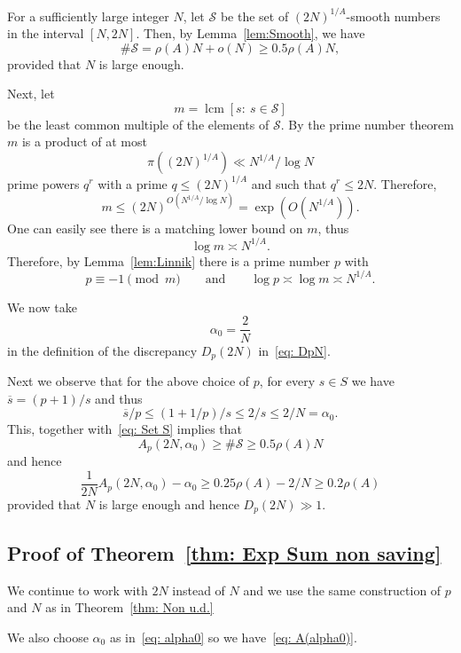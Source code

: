 \documentclass[12pt]{amsart}
\numberwithin{equation}{section}
\numberwithin{theorem}{section}
\numberwithin{table}{section}
\numberwithin{figure}{section}
\def\cS{{\mathcal S}}
\def\le{\leqslant}
\def\ge{\geqslant}
\def\sbar{\overline{s}}
\def\mand{\qquad\mbox{and}\qquad}
\def\({\left(}
\def\){\right)}
\newcommand{\lcm}{\operatorname{lcm}}
\begin{document}
For a sufficiently large integer $N$, let $\cS$ be the set  of $(2N)^{1/A}$-smooth numbers in the interval $[N, 2N]$. 
Then, by Lemma~\ref{lem:Smooth}, we have 
\begin{equation}
\label{eq: Set S}
\# \cS =  \rho(A) N + o(N)  \ge 0.5  \rho(A) N , 
\end{equation}
provided that $N$ is large enough. 

Next, let 
$$
m = \lcm[s:~s \in \cS]
$$
be the least common multiple of the elements of $\cS$.  By the prime number theorem $m$ is a 
product of at most 
$$
\pi\((2N)^{1/A}\) \ll N^{1/A}/\log N
$$ 
prime powers $q^r$ with a prime $q\le (2N)^{1/A}$ and such that $q^r\le 2N$.  
Therefore, 
$$
m \le (2N)^{O\(N^{1/A}/\log N\)} =  \exp\(O\(N^{1/A}\)\).
$$
One can easily see there is a matching lower bound on $m$, thus 
$$
\log m \asymp  N^{1/A}.
$$
Therefore, by  Lemma~\ref{lem:Linnik} there is a prime number $p$ with 
$$
p \equiv - 1  \pmod {m}  \mand  \log p  \asymp \log m  \asymp N^{1/A}. 
$$


We now take 
\begin{equation}
\label{eq: alpha0}
\alpha_0 = \frac{2}{N}
\end{equation}
in the definition of the discrepancy $D_p(2N)$ in~\eqref{eq: DpN}. 

Next we observe that for the above choice of $p$, for every $s\in S$ we have  
$\sbar  = (p+1)/s$ and thus 
\begin{equation}
\label{eq: small sbar}
\sbar/p \le (1+1/p)/s \le 2/s \le 2/N = \alpha_0.
\end{equation}
This, together with~\eqref{eq: Set S} implies that 
\begin{equation}
\label{eq: A(alpha0)}
A_p(2N, \alpha_0)  \ge \# \cS \ge 0.5  \rho(A) N
\end{equation}
and hence 
$$
 \frac{1}{2N}  A_p(2N, \alpha_0) - \alpha_0 \ge  0.25  \rho(A)  - 2/N \ge 0.2   \rho(A)
$$
provided that $N$ is large enough and hence  $D_p(2N) \gg 1$.



\subsection{Proof of Theorem~\ref{thm: Exp Sum non saving}}
We continue to work with $2N$ instead of $N$ and we use the same construction of $p$ and $N$ as in Theorem~\ref{thm: Non u.d.}

We also choose $\alpha_0$ as in~\eqref{eq: alpha0} so we have~\eqref{eq: A(alpha0)}.
\end{document}

